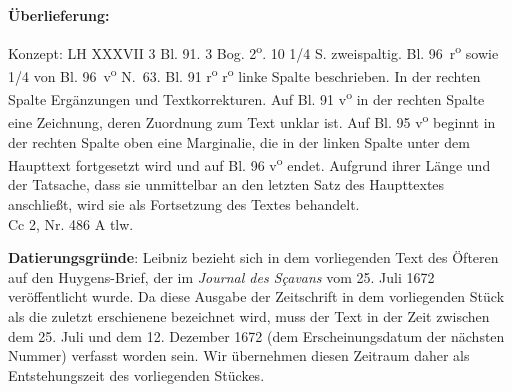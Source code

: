       
               
                \begin{ledgroupsized}[r]{120mm}
                \footnotesize 
                \pstart                
                \noindent\textbf{\"{U}berlieferung:}   
                \pend
                \end{ledgroupsized}
            
              
                            \begin{ledgroupsized}[r]{114mm}
                            \footnotesize 
                            \pstart \parindent -6mm
                            Konzept: LH XXXVII 3 Bl. 91. 3 Bog. 2\textsuperscript{o}. 10 1/4 S. zweispaltig. Bl. 96~r\textsuperscript{o} sowie 1/4 von Bl. 96~v\textsuperscript{o} N.~63. Bl. 91 r\textsuperscript{o} r\textsuperscript{o} linke Spalte beschrieben. In der rechten Spalte Erg\"{a}nzungen und Textkorrekturen. Auf Bl. 91 v\textsuperscript{o} in der rechten Spalte eine Zeichnung, deren Zuordnung zum Text unklar ist. Auf Bl. 95 v\textsuperscript{o} beginnt in der rechten Spalte oben eine Marginalie, die in der linken Spalte unter dem Haupttext fortgesetzt wird und auf Bl. 96 v\textsuperscript{o} endet. Aufgrund ihrer Länge und der Tatsache, dass sie unmittelbar an den letzten Satz des Haupttextes anschließt, wird sie als Fortsetzung des Textes behandelt.\\Cc 2, Nr. 486 A tlw. \pend
                            \end{ledgroupsized}
                \vspace*{5mm}
                \begin{ledgroup}
                \footnotesize 
                \pstart
            \noindent\footnotesize{\textbf{Datierungsgr\"{u}nde}: Leibniz bezieht sich in dem vorliegenden Text des \"{O}fteren auf den Huygens-Brief, der im \cite{00062}\textit{Journal des S\c{c}avans} vom 25. Juli 1672 ver\"{o}ffentlicht wurde. Da diese Ausgabe der Zeitschrift in dem vorliegenden St\"{u}ck als die zuletzt erschienene bezeichnet wird, muss der Text in der Zeit zwischen dem 25. Juli und dem 12. Dezember 1672 (dem Erscheinungsdatum der n\"{a}chsten Nummer) verfasst worden sein. Wir \"{u}bernehmen diesen Zeitraum daher als Entstehungszeit des vorliegenden St\"{u}ckes.}
                \pend
                \end{ledgroup}
            
